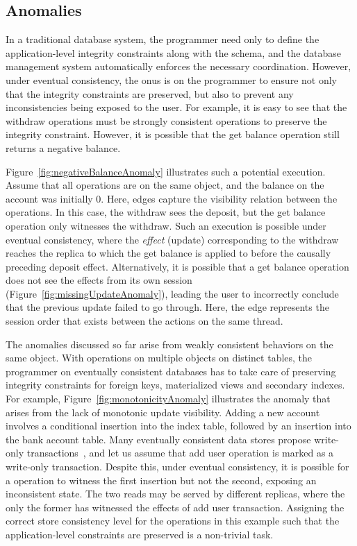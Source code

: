 \subsection{Anomalies}

In a traditional database system, the programmer need only to define the
application-level integrity constraints along with the schema, and the database
management system automatically enforces the necessary coordination. However,
under eventual consistency, the onus is on the programmer to ensure not only
that the integrity constraints are preserved, but also to prevent any
inconsistencies being exposed to the user. For example, it is easy to see that
the withdraw operations must be strongly consistent operations to preserve the
integrity constraint. However, it is possible that the get balance operation
still returns a negative balance.

Figure~\ref{fig:negativeBalanceAnomaly} illustrates such a potential execution.
Assume that all operations are on the same object, and the balance on the
account was initially 0. Here,  edges capture the visibility
relation between the operations. In this case, the withdraw sees the deposit,
but the get balance operation only witnesses the withdraw. Such an execution is
possible under eventual consistency, where the \emph{effect} (update)
corresponding to the withdraw reaches the replica to which the get balance is
applied to before the causally preceding deposit effect. Alternatively, it is
possible that a get balance operation does not see the effects from its own
session (Figure~\ref{fig:missingUpdateAnomaly}), leading the user to
incorrectly conclude that the previous update failed to go through. Here, the
 edge represents the session order that exists between the actions
on the same thread.

The anomalies discussed so far arise from weakly consistent behaviors on the
same object. With operations on multiple objects on distinct tables, the
programmer on eventually consistent databases has to take care of preserving
integrity constraints for foreign keys, materialized views and secondary
indexes. For example, Figure~\ref{fig:monotonicityAnomaly} illustrates the
anomaly that arises from the lack of monotonic update visibility. Adding a new
account involves a conditional insertion into the index table, followed by an
insertion into the bank account table. Many eventually consistent data stores
propose write-only transactions~\cite{}, and let us assume that add user
operation is marked as a write-only transaction. Despite this, under eventual
consistency, it is possible for a  operation to witness the
first insertion but not the second, exposing an inconsistent state. The two
reads may be served by different replicas, where the only the former has
witnessed the effects of add user transaction. Assigning the correct store
consistency level for the operations in this example such that the
application-level constraints are preserved is a non-trivial task.

